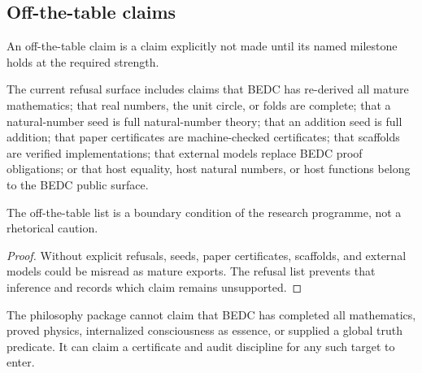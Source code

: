 \subsection{Off-the-table claims}
\label{subsec:philosophy-programme-off-table}

\begin{definition}
\label{def:philosophy-programme-off-table-claim}
An off-the-table claim is a claim explicitly not made until its named
milestone holds at the required strength.
\end{definition}

\begin{definition}
\label{def:philosophy-programme-current-refusal-list}
The current refusal surface includes claims that BEDC has re-derived
all mature mathematics; that real numbers, the unit circle, or folds
are complete; that a natural-number seed is full natural-number theory;
that an addition seed is full addition; that paper certificates are
machine-checked certificates; that scaffolds are verified
implementations; that external models replace BEDC proof obligations;
or that host equality, host natural numbers, or host functions belong
to the BEDC public surface.
\end{definition}

\begin{theorem}
\label{thm:philosophy-programme-off-table-boundary}
The off-the-table list is a boundary condition of the research
programme, not a rhetorical caution.
\end{theorem}
\begin{proof}
Without explicit refusals, seeds, paper certificates, scaffolds, and
external models could be misread as mature exports. The refusal list
prevents that inference and records which claim remains unsupported.
\end{proof}

\begin{corollary}
\label{cor:philosophy-programme-synthesis-not-overclaim}
The philosophy package cannot claim that BEDC has completed all
mathematics, proved physics, internalized consciousness as essence, or
supplied a global truth predicate. It can claim a certificate and audit
discipline for any such target to enter.
\end{corollary}
